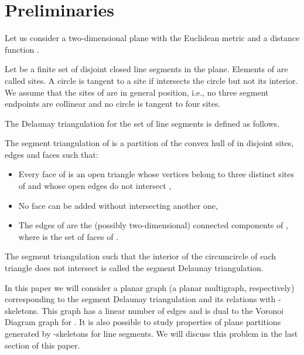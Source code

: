 \documentclass[11pt]{llncs}
\begin{document}
\section{Preliminaries}


Let us consider a two-dimensional plane  with the Euclidean metric 
and a distance function . 


Let  be a finite set of disjoint closed line segments in the plane.
Elements of  are called sites.
A circle is tangent to a site  if  intersects the circle 
but not its interior.
We assume that the sites of  are in general position, i.e., no three segment 
endpoints are collinear and no circle is tangent to four sites.

 The Delaunay triangulation for the set of line segments  
is defined as follows.




\begin{definition} \cite{bcs07}
\label{segment-dt}
 The segment triangulation  of  is a partition of the convex hull  of  
in disjoint sites, edges and faces such that:
\begin{itemize}
\item
Every face of  is an open triangle whose vertices belong to three distinct sites of  
and whose open edges do not intersect ,
\item
No face can be added without intersecting another one,
\item
The edges of  are the (possibly two-dimensional) connected components 
of , where  is the set of faces of .
\end{itemize} 

The segment triangulation  such that the interior of the circumcircle of each triangle 
does not intersect  is called the segment Delaunay triangulation. 

\end{definition}

 In this paper we will consider a planar graph (a planar multigraph, respectively) 
 corresponding to the segment Delaunay triangulation  and its relations 
with -skeletons. This graph has a linear number of edges and is dual to the Voronoi Diagram graph for .
It is also possible to study properties of plane partitions generated by -skeletons 
for line segments. We will discuss this problem in the last section of this paper. 
\end{document}
